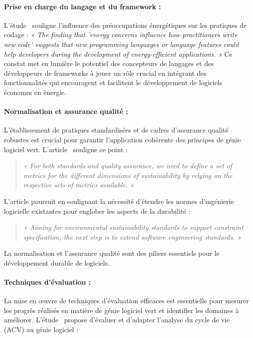 \paragraph{Prise en charge du langage et du framework :} L'étude~\cite{EmpiricalStudy} souligne l'influence des préoccupations énergétiques sur les pratiques de codage : \emph{« The finding that 'energy concerns influence how practitioners write new code' suggests that new programming languages or language features could help developers during the development of energy-efficient applications. »} Ce constat met en lumière le potentiel des concepteurs de langages et des développeurs de frameworks à jouer un rôle crucial en intégrant des fonctionnalités qui encouragent et facilitent le développement de logiciels économes en énergie.

\paragraph{Normalisation et assurance qualité :} L'établissement de pratiques standardisées et de cadres d'assurance qualité robustes est crucial pour garantir l'application cohérente des principes de génie logiciel vert. L'article~\cite{SafetySecuritySustainability} souligne ce point :

\begin{quote}
    
    \emph{« For both standards and quality assurance, we need to define a set of metrics for the different dimensions of sustainability by relying on the respective sets of metrics available. »}
\end{quote}


L'article poursuit en soulignant la nécessité d'étendre les normes d'ingénierie logicielle existantes pour englober les aspects de la durabilité :

\begin{quote}
    
    \emph{« Aiming for environmental sustainability standards to support constraint specification, the next step is to extend software engineering standards. »}
\end{quote}


La normalisation et l'assurance qualité sont des piliers essentiels pour le développement durable de logiciels.

\paragraph{Techniques d'évaluation :} La mise en œuvre de techniques d'évaluation efficaces est essentielle pour mesurer les progrès réalisés en matière de génie logiciel vert et identifier les domaines à améliorer. L'étude~\cite{SafetySecuritySustainability} propose d'évaluer et d'adapter l'analyse du cycle de vie (ACV) au génie logiciel :

